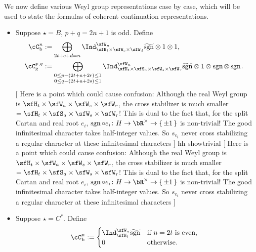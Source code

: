 \documentclass[12pt,a4paper]{amsart}
\newcommand{\trivial}[2][]{\if\relax\detokenize{#1}\relax
  {%
      \color{orange} \vspace{0em} $[$  #2 $]$
      \color{black}
  }
  \else
\ifx#1h
\ifcsname showtrivial\endcsname
{%
    \color{orange} \vspace{0em}  $[$ #2 $]$
    \color{black}
}
\fi
\else {\red Wrong argument!} \fi
\fi
}
\newcommand{\Res}{\mathrm{Res}}
\newcommand{\sgn}{\operatorname{sgn}}
\numberwithin{equation}{section}
\theoremstyle{remark}
\def\brsgn{\breve{\sgn}}
\def\hsgn{\widetilde{\mathrm{sgn}}}
\begin{document}
We now define various Weyl group representations case by case, which will be used to
state the formulas of coherent continuation representations.
\begin{itemize}
  \item Suppose $\star= B$, $p+q=2n+1$ is odd. Define
        \[
        \begin{split}
          \cC_{\mathrm b}^{n} & :=\bigoplus_{\substack{2t+c+d=n}} \Ind_{\sfH_{t} \times \sfW_{c}\times \sfW_{d}}^{\sfW_{n}}
          \hsgn\otimes 1\otimes 1, \\
          \cC_{\mathrm g}^{p,q} &:=\bigoplus_{\substack{0\leq p-(2t+a+2r)\leq 1\\0\leq q - (2t+a+2s)\leq 1}} \Ind_{\sfH_{t} \times \sfS_{a}\times \sfW_s\times \sfW_r}^{\sfW_{n}}
          \hsgn \otimes 1 \otimes \sgn \otimes \sgn. \\
        \end{split}
        \]
        \trivial[h]{ Here is a point which could cause confusion: Although the
        real Weyl group is
        $\sfH_{t}\times \sfW_{a}\times \sfW_{s}\times \sfW_{r}$, the cross
        stabilizer is much smaller
        $=\sfH_{t}\times \sfS_{a}\times \sfW_{s}\times \sfW_{r}$! This is dual
        to the fact that, for the split Cartan and real root $e_{i}$,
        $\sgn\circ e_{i}\colon H\rightarrow \bR^{\times}\rightarrow \set{\pm 1}$
        is non-trivial! The good infinitesimal character takes half-integer
        values. So $s_{e_{i}}$ never cross stabilizing a regular character at
        these infinitesimal characters }
  \item Suppose $\star=C^{*}$. Define
        \[
        \begin{split}
          \cC_{\mathrm b}^{n} & :=
          \begin{cases}
            \Ind_{\sfH_{t}}^{\sfW_{n}} \hsgn &
            \text{if $n=2t$ is even}, \\
            0 & \text{otherwise}.\\
          \end{cases}\\

\end{split}\]
\end{itemize}
\end{document}
